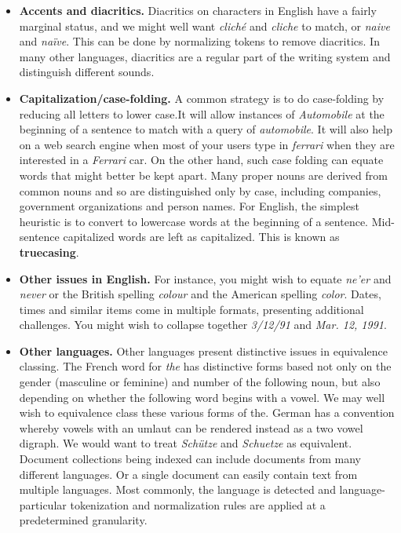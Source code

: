 \documentclass[letterpaper,11pt]{article}
\begin{document}
\begin{itemize}
    \item \textbf{Accents and diacritics.} Diacritics on characters in English have a fairly marginal status, and we might well want \textit{cliché} and \textit{cliche} to match, or \textit{naive} and \textit{naïve}. This can be done by normalizing tokens to remove diacritics. In many other languages, diacritics are a regular part of the writing system and distinguish different sounds. 
    \item \textbf{Capitalization/case-folding.} A common strategy is to do case-folding by reducing all letters to lower case.It will allow instances of \textit{Automobile} at the beginning of a sentence to match with a query of \textit{automobile}. It will also help on a web search engine when most of your users type in \textit{ferrari} when they are interested in a \textit{Ferrari} car. On the other hand, such case folding can equate words that might better be kept apart. Many proper nouns are derived from common nouns and so are distinguished only by case, including companies, government organizations and person names. For English, the simplest heuristic is to convert to lowercase words at the beginning of a sentence. Mid-sentence capitalized words are left as capitalized. This is known as \textbf{truecasing}.
    \item \textbf{Other issues in English.} For instance, you might wish to equate \textit{ne’er} and \textit{never} or the British spelling \textit{colour} and the American spelling \textit{color}. Dates, times and similar items come in multiple formats, presenting additional challenges. You might wish to collapse together \textit{3/12/91} and \textit{Mar. 12, 1991}.
    \item \textbf{Other languages.} Other languages present distinctive issues in equivalence classing. The French word for \textit{the} has distinctive forms based not only on the gender (masculine or feminine) and number of the following noun, but also depending on whether the following word begins with a vowel. We may well wish to equivalence class these various forms of the. German has a convention whereby vowels with an umlaut can be rendered instead as a two vowel digraph. We would want to treat \textit{Schütze} and \textit{Schuetze} as equivalent. Document collections being indexed can include documents from many different languages. Or a single document can easily contain text from multiple languages. Most commonly, the language is detected and language-particular tokenization and normalization rules are applied at a predetermined granularity.
\end{itemize}
\end{document}
